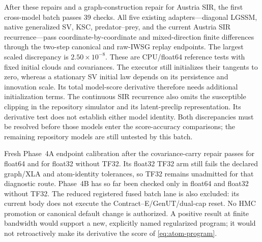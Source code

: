 \documentclass[11pt]{article}
\newcommand{\GenUT}{\ensuremath{\mathrm{GenUT}}}
\begin{document}
After these repairs and a graph-construction repair for Austria SIR, the first
cross-model batch passes 39 checks.  All five existing adapters---diagonal
LGSSM, native generalized SV, KSC, predator--prey, and the current Austria SIR
recurrence---pass coordinate-by-coordinate and mixed-direction finite
differences through the two-step canonical and raw-IWSG replay endpoints.
The largest scaled discrepancy is $2.50\times10^{-8}$.  These are CPU/float64
reference tests with fixed initial clouds and covariances.  The executor still
initializes their tangents to zero, whereas a stationary SV initial law depends
on its persistence and innovation scale.  Its total model-score derivative
therefore needs additional initialization terms.  The continuous SIR
recurrence also omits the susceptible clipping in the repository simulator
and its latent-preclip representation.  Its derivative test does not establish
either model identity.  Both discrepancies must be resolved before those
models enter the score-accuracy comparisons; the remaining repository models
are still untested by this batch.

Fresh Phase~4A endpoint calibration after the covariance-carry repair passes
for float64 and for float32 without TF32.  Its float32 TF32 arm still fails the
declared graph/XLA and atom-identity tolerances, so TF32 remains unadmitted for
that diagnostic route.  Phase~4B has so far been checked only in float64 and
float32 without TF32.  The reduced registered fused batch lane is also
excluded: its current body does not execute the
Contract--E/\GenUT{}/dual-cap reset.  No HMC promotion or canonical default
change is authorized.  A positive result at finite bandwidth would support a
new, explicitly named regularized program; it would not retroactively make its
derivative the score of \eqref{eq:atom-program}.



\end{document}
